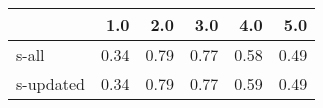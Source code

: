 \begin{tabular}{lrrrrr}
\toprule
{} &  1.0 &  2.0 &  3.0 &  4.0 &  5.0 \\
\midrule
s-all     & 0.34 & 0.79 & 0.77 & 0.58 & 0.49 \\
s-updated & 0.34 & 0.79 & 0.77 & 0.59 & 0.49 \\
\bottomrule
\end{tabular}
